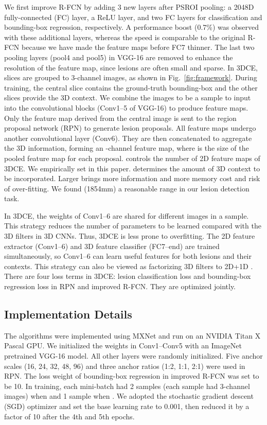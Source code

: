 \documentclass[a4paper]{llncs}
\def\Fig#1{{Fig.\ \ref{fig:#1}}}
\begin{document}
We first improve R-FCN by adding 3 new layers after PSROI pooling: a 2048D fully-connected (FC) layer, a ReLU layer, and two FC layers for classification and bounding-box regression, respectively. A performance boost (0.7\%) was observed with these additional layers, whereas the speed is comparable to the original R-FCN because we have made the feature maps before FC7 thinner. The last two pooling layers (pool4 and pool5) in VGG-16 are removed to enhance the resolution of the feature map, since lesions are often small and sparse. In 3DCE,  slices are grouped to  3-channel images, as shown in \Fig{framework}. During training, the central slice contains the ground-truth bounding-box and the other slices provide the 3D context. We combine the  images to be a sample to input into the convolutional blocks (Conv1--5 of VGG-16) to produce  feature maps. Only the feature map derived from the central image is sent to the region proposal network (RPN) to generate lesion proposals. All feature maps undergo another convolutional layer (Conv6). They are then concatenated to aggregate the 3D information, forming an -channel feature map, where  is the size of the pooled feature map for each proposal.  controls the number of 2D feature maps of 3DCE. We empirically set  in this paper.  determines the amount of 3D context to be incorporated. Larger  brings more information and more memory cost and risk of over-fitting. We found  (1854mm) a reasonable range in our lesion detection task.

In 3DCE, the weights of Conv1--6 are shared for different images in a sample. This strategy reduces the number of parameters to be learned compared with the 3D filters in 3D CNNs. Thus, 3DCE is less prone to overfitting. The 2D feature extractor (Conv1--6) and 3D feature classifier (FC7--end) are trained simultaneously, so Conv1--6 can learn useful features for both lesions and their contexts. This strategy can also be viewed as factorizing 3D filters to 2D+1D \cite{Qiu2017P3D}. There are four loss terms in 3DCE: lesion classification loss and bounding-box regression loss in RPN and improved R-FCN. They are optimized jointly.

\subsection{Implementation Details}
\label{subsec:detail}

The algorithms were implemented using MXNet \cite{Chen2015MXNet} and run on an NVIDIA Titan X Pascal GPU. We initialized the weights in Conv1--Conv5 with an ImageNet \cite{Deng2009ImgNet} pretrained VGG-16 model. All other layers were randomly initialized. Five anchor scales (16, 24, 32, 48, 96) and three anchor ratios (1:2, 1:1, 2:1) were used in RPN. The loss weight of bounding-box regression in improved R-FCN was set to be 10. In training, each mini-batch had 2 samples (each sample had  3-channel images) when  and 1 sample when . We adopted the stochastic gradient descent (SGD) optimizer and set the base learning rate to 0.001, then reduced it by a factor of 10 after the 4th and 5th epochs.
\end{document}
